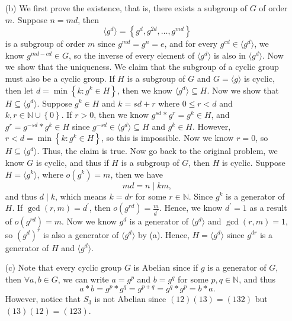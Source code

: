 \documentclass[12pt]{article}
\begin{document}
\begin{enumerate}
\begin{itemize}
\begin{itemize}
        \end{itemize}
        \item [(b)] We first prove the existence, that is, there exists a subgroup of \(G\) of order \(m\). Suppose \(n = md\), then 
        \[
            \langle g^d \rangle = \left\{ g^d, g^{2d}, \dots , g^{md} \right\} 
        \] is a subgroup of order \(m\) since \(g^{md} = g^n = e\), and for every \(g^{cd} \in \langle g^d \rangle \), we know \(g^{md - cd} \in G\), so the inverse of every element of \(\langle g^d \rangle \) is also in \(\langle g^d \rangle \). Now we show that the uniqueness. We claim that the subgroup of a cyclic group must also be a cyclic group. If \(H\) is a subgroup of \(G\) and \(G = \langle g \rangle \) is cyclic, then let \(d = \min \left\{ k : g^k \in H \right\} \), then we know \(\langle g^d \rangle \subseteq H\). Now we show that \(H \subseteq \langle g^d \rangle \). Suppose \(g^k \in H\) and \(k = sd + r\) where \(0 \le r < d\) and \(k, r \in \mathbb{N} \cup \left\{ 0 \right\} \). If \(r > 0\), then we know \(g^{sd} * g^r = g^k \in H\), and \(g^r = g^{-sd} * g^{k} \in H \) since \(g^{-sd} \in \langle g^d \rangle \subseteq H\) and \(g^k \in H\). However, \(r < d = \min \left\{ k: g^k \in H \right\} \), so this is impossible. Now we know \(r = 0\), so \(H \subseteq \langle g^d \rangle \). Thus, the claim is true. Now go back to the original problem, we know \(G\) is cyclic, and thus if \(H\) is a subgroup of \(G\), then \(H\) is cyclic. Suppose \(H = \langle g^k \rangle \), where \(o\left( g^k \right) = m\), then we have 
        \[
            md = n \mid km ,
        \] and thus \(d \mid k\), which means \(k = dr\) for some \(r \in \mathbb{N}\). Since \(g^k\) is a generator of \(H\). If \(\gcd(r, m) = d^{\prime}\), then \(o\left( g^{rd} \right) = \frac{m}{d^{\prime} } \).  Hence, we know \(d^{\prime} = 1\) as a result of \(o\left( g^{rd} \right) = m\). Now we know \(g^d\) is a generator of \(\langle g^d \rangle \) and \(\gcd(r, m) = 1\), so \(\left( g^d \right)^r \) is also a generator of \(\langle g^d \rangle \) by (a). Hence, \(H = \langle g^{d} \rangle \) since \(g^{dr}\) is a generator of \(H\) and \(\langle g^d \rangle \).      
        \item [(c)] Note that every cyclic group \(G\) is Abelian since if \(g\) is a generator of \(G\), then \(\forall a, b \in G\), we can write \(a = g^p\) and \(b = g^q\) for some \(p, q \in \mathbb{N} \), and thus 
        \[
            a * b = g^p * g^q = g^{p + q} = g^q * g^p = b * a.
        \]
        However, notice that \(S_3\) is not Abelian since \((12)(13)=(132)\) but \((13)(12)=(123)\). 
    \end{itemize}


\end{enumerate}
\end{document}
